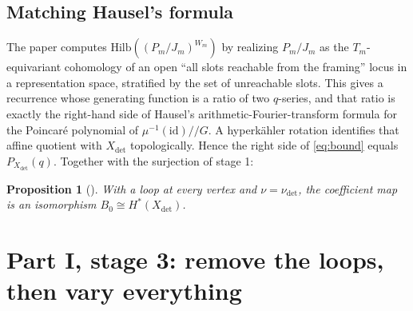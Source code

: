 \documentclass[11pt]{amsart}
\newtheorem{proposition}[theorem]{Proposition}
\theoremstyle{remark}
\newcommand{\Hilb}{\mathrm{Hilb}}
\begin{document}
\subsection{Matching Hausel's formula}
The paper computes $\Hilb((P_m/J_m)^{W_m})$ by realizing $P_m/J_m$ as the
$T_m$-equivariant cohomology of an open ``all slots reachable from the
framing'' locus in a representation space, stratified by the set of
unreachable slots.  This gives a recurrence whose generating function is a
ratio of two $q$-series, and that ratio is exactly the right-hand side of
Hausel's arithmetic-Fourier-transform formula \cite{Hausel06} for the
Poincar\'e polynomial of $\mu^{-1}(\mathrm{id})/\!/G$.  A hyperk\"ahler
rotation identifies that affine quotient with $X_{\det}$ topologically.
Hence the right side of \eqref{eq:bound} equals $P_{X_{\det}}(q)$.
Together with the surjection of stage 1:

\begin{proposition}[{\cite[Cor.~6.6]{OAI-Hikita}}]
With a loop at every vertex and $\nu=\nu_{\det}$, the coefficient map is an
isomorphism $B_0\cong H^*(X_{\det})$.
\end{proposition}

\section{Part I, stage 3: remove the loops, then vary everything}
\end{document}
